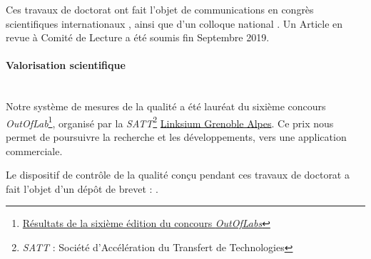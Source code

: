 \bigskip
Ces travaux de doctorat ont fait l’objet de communications en congrès scientifiques internationaux \cite{nagorny_towards_2017, nagorny_injection_2017, nagorny_quality_2017, nagorny_generative_2018, nagorny_polarimetric_2019}, ainsi que d'un colloque national \cite{nagorny_towards_2017}.
Un Article en revue à Comité de Lecture a été soumis fin Septembre 2019.

\paragraph{Valorisation scientifique}\mbox{} \\

\bigskip
Notre système de mesures de la qualité a été lauréat du sixième concours \textit{OutOfLab}\footnote{\href{http://outoflabs.linksium.fr/resultats/}{Résultats de la sixième édition du concours \textit{OutOfLabs}}}, organisé par la \textit{SATT}\footnote{\textit{SATT} : Société d'Accélération du Transfert de Technologies} \href{https://www.linksium.fr/}{Linksium Grenoble Alpes}.
Ce prix nous permet de poursuivre la recherche et les développements, vers une application commerciale.

Le dispositif de contrôle de la qualité conçu pendant ces travaux de doctorat a fait l'objet d'un dépôt de brevet :  \cite{nagorny_dispositif_2019}.

